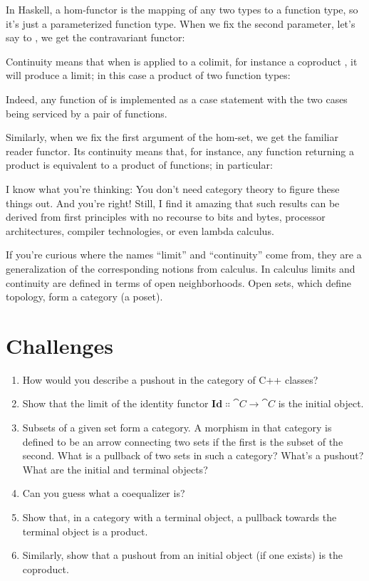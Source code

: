 In Haskell, a hom-functor is the mapping of any two types to a function
type, so it's just a parameterized function type. When we fix the second
parameter, let's say to , we get the contravariant
functor:

Continuity means that when  is applied to a colimit,
for instance a coproduct , it will produce a limit;
in this case a product of two function types:

Indeed, any function of  is implemented as a case
statement with the two cases being serviced by a pair of functions.

Similarly, when we fix the first argument of the hom-set, we get the
familiar reader functor. Its continuity means that, for instance, any
function returning a product is equivalent to a product of functions; in
particular:

I know what you're thinking: You don't need category theory to figure
these things out. And you're right! Still, I find it amazing that such
results can be derived from first principles with no recourse to bits
and bytes, processor architectures, compiler technologies, or even
lambda calculus.

If you're curious where the names ``limit'' and ``continuity'' come
from, they are a generalization of the corresponding notions from
calculus. In calculus limits and continuity are defined in terms of open
neighborhoods. Open sets, which define topology, form a category (a
poset).

\section{Challenges}

\begin{enumerate}
\tightlist
\item
  How would you describe a pushout in the category of C++ classes?
\item
  Show that the limit of the identity functor
  $\mathbf{Id} \Colon \cat{C} \to \cat{C}$ is the initial object.
\item
  Subsets of a given set form a category. A morphism in that category is
  defined to be an arrow connecting two sets if the first is the subset
  of the second. What is a pullback of two sets in such a category?
  What's a pushout? What are the initial and terminal objects?
\item
  Can you guess what a coequalizer is?
\item
  Show that, in a category with a terminal object, a pullback towards
  the terminal object is a product.
\item
  Similarly, show that a pushout from an initial object (if one exists)
  is the coproduct.
\end{enumerate}
